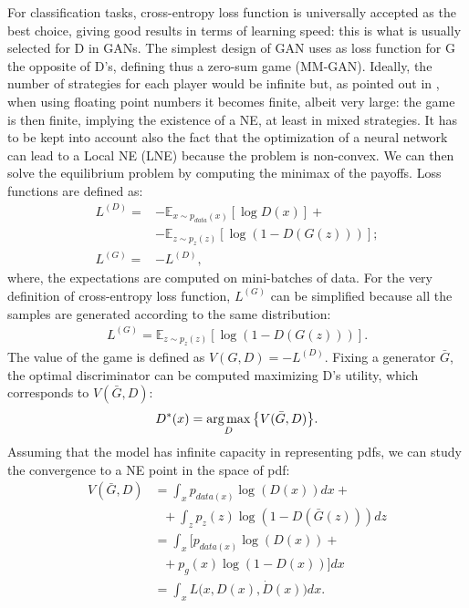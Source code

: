 For classification tasks, cross-entropy loss function is universally accepted as the best choice, giving good results in terms of learning speed: this is what is usually selected for D in GANs.
The simplest design of GAN uses as loss function for G the opposite of D's, defining thus a zero-sum game (MM-GAN).
Ideally, the number of strategies for each player would be infinite but, as pointed out in  \cite{2017arXiv171200679O}, when using floating point numbers it becomes finite, albeit very large: the game is then finite, implying the existence of a NE, at least in mixed strategies.
It has to be kept into account also the fact that the optimization of a neural network can lead to a Local NE (LNE) because the problem is non-convex.
We can then solve the equilibrium problem by computing the minimax of the payoffs.
Loss functions are defined as:
\begin{equation*}
	\begin{split}
		L^{(D)} = &-\mathbb{E}_{x \sim p_{data}(x)}[\log D(x)]+\\
		          &- \mathbb{E}_{z \sim p_{z}(z)}[\log (1-D(G(z)))];\\
		L^{(G)} = &- L^{(D)},
	\end{split}
\end{equation*}
where, the expectations are computed on mini-batches of data.
For the very definition of cross-entropy loss function, $L^{(G)}$ can be simplified because all the samples are generated according to the same distribution: 
\begin{align*}
L^{(G)} = \mathbb{E}_{z \sim p_{z}(z)}[\log (1-D(G(z)))].
\end{align*}
The value of the game is defined as $V(G,D)=-L^{(D)}$.
Fixing a generator $\bar{G}$, the optimal discriminator can be computed maximizing D's utility, which corresponds to $V(\bar{G},D)$:
\begin{align*}
D^*(x) = \operatorname*{arg\,max}\limits_{D} \big\{V(\bar{G},D) \big\}.
\end{align*}
Assuming that the model has infinite capacity in representing pdfs, we can study the convergence to a NE point in the space of pdf:
\begin{equation*}
\begin{split}
V(\bar{G},D) & = \int_x p_{data(x)} \log(D(x)) dx +\\
             & \ \ \ + \int_z p_{z}(z) \log(1-D(\bar{G}(z))) dz\\
             & = \int_x\Big[p_{data(x)} \log(D(x)) +\\
             & \ \ \ + p_{g}(x) \log(1-D(x)) \Big]dx\\
             & = \int_x L\big(x,D(x),\dot{D}(x)\big)dx.
\end{split}
\end{equation*}
